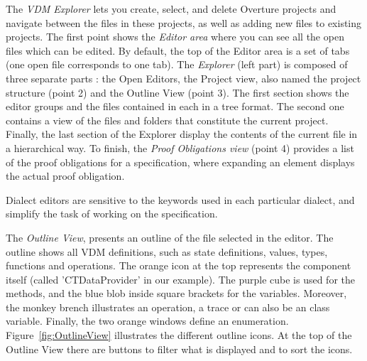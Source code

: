 \documentclass{overturerepchap}
\begin{document}
The \emph{VDM Explorer} lets you create, select,
and delete Overture projects and navigate between the files in these
projects, as well as adding new files to existing projects. 
The first point shows the \emph{Editor area} where you can see all the open files which can be edited. By default, the top of the Editor area is a set of tabs (one open file corresponds to one tab).
The \emph{Explorer} (left part) is composed of three separate parts : the Open Editors, the Project view, also named the project structure (point 2) and the Outline View (point 3). The first section shows the editor groups and the files contained in each in a tree format. The second one contains a view of the files and folders that constitute the current project. Finally, the last section of the Explorer display the contents of the current file in a hierarchical way.
To finish, the \emph{Proof Obligations view} (point 4) provides a list of the proof obligations for a specification, where expanding an element displays the actual proof obligation.

 Dialect editors are sensitive to the keywords used in
each particular dialect, and simplify the task of working on the
specification.



\newpage
The \emph{Outline View},  presents an outline of
the file selected
in the editor. The outline shows all VDM definitions, such as
state definitions, values, types, functions and operations. The orange icon at the top represents the component itself (called 'CTDataProvider' in our example). The purple cube is used for the methods, and the blue blob inside square brackets for the variables. Moreover, the monkey brench illustrates an operation, a trace or can also be an class variable. Finally, the two orange windows define an enumeration.
Figure~\ref{fig:OutlineView} illustrates the different outline icons.
At the top of the Outline View there are buttons to filter what is displayed and to sort the icons.
\end{document}
